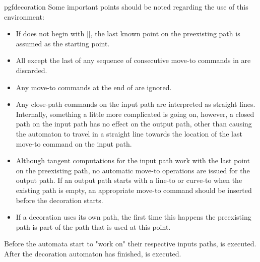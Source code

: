 \begin{environment}{{pgfdecoration}}
    Some important points should be noted regarding the use of this
    environment:
    \begin{itemize}
        \item If  does not begin with
            |\pgfpathmoveto|, the last known point on the preexisting path is
            assumed as the starting point.
        \item All except the last of any sequence of consecutive move-to
            commands in  are discarded.
        \item Any move-to commands at the end of 
            are ignored.
        \item Any close-path commands on the input path are interpreted as
            straight lines. Internally, something a little more complicated is
            going on, however, a closed path on the input path has no effect on
            the output path, other than causing the automaton to travel in a
            straight line towards the location of the last move-to command on
            the input path.
        \item Although tangent computations for the input path work with the
            last point on the preexisting path, no automatic move-to operations
            are issued for the output path. If an output path starts with a
            line-to or curve-to when the existing path is empty, an appropriate
            move-to command should be inserted before the decoration starts.
        \item If a decoration uses its own path, the first time this happens
            the preexisting path is part of the path that is used at this
            point.
    \end{itemize}

    Before the automata start to "work on" their respective inputs paths,
     is executed. After the decoration automaton has
    finished,  is executed.
\begin{codeexample}[preamble={\usetikzlibrary{decorations,decorations.pathmorphing}}]
\end{codeexample}


\end{environment}
